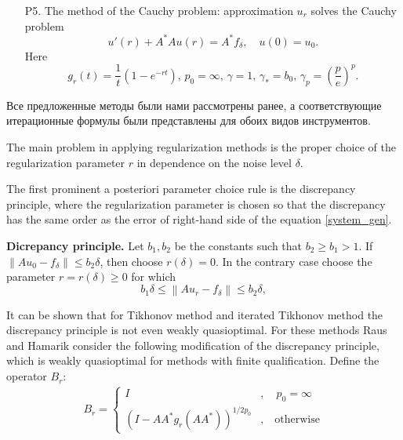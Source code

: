 \documentclass[10pt]{article}
\theoremstyle{definition}
\theoremstyle{remark}
\theoremstyle{plain}
\begin{document}
\begin{itemize}
\item[P5.] 
The method of the Cauchy problem: approximation $u_r$ solves the Cauchy problem 
$$
u'(r) + A^*Au(r) = A^*f_\delta, \quad u(0)= u_0.
$$
Here
$$
g_r(t) = \frac{1}{t}\left(1 - e^{-rt}\right), \,
p_0=\infty, \,
\gamma = 1, \,
\gamma_* = b_0, \,
\gamma_p = \left(\frac{p}{e}\right)^p.
$$
\end{itemize}

Все предложенные методы были нами рассмотрены ранее, а соответствующие итерационные формулы были представлены для обоих видов инструментов.

The main problem in applying regularization methods is the proper choice of the regularization parameter $r$ in dependence on the noise level $\delta$.

The first prominent a posteriori parameter choice rule is the discrepancy principle, where the regularization parameter is chosen so that the discrepancy has the same order as the error of right-hand side of the equation \eqref{system_gen}.

\textbf{Dicrepancy principle.} 
Let $b_1,b_2$ be the constants such that $b_2\geqslant b_1 > 1$. If $\left\|Au_0 - f_\delta\right\|\leqslant b_2\delta$, then choose $r(\delta)=0$. In the contrary case choose the parameter $r = r(\delta)\geqslant 0$ for which 
$$
b_1\delta \leqslant \left\| Au_r - f_\delta \right\| \leqslant b_2\delta,
$$

It can be shown that for Tikhonov method and iterated Tikhonov method the discrepancy
principle is not even weakly quasioptimal. For these methods Raus and Hamarik consider
the following modification of the discrepancy principle, which is weakly quasioptimal for methods with finite qualification. 
Define the operator $B_r$:
\begin{align*}
B_r = 
\left\{
	\begin{aligned}
	I&,\quad p_0 = \infty \\
	(I-AA^*g_r(AA^*))^{1/2p_0}&, \quad \text{otherwise}
	\end{aligned}
\right.
\end{align*}
\end{document}
